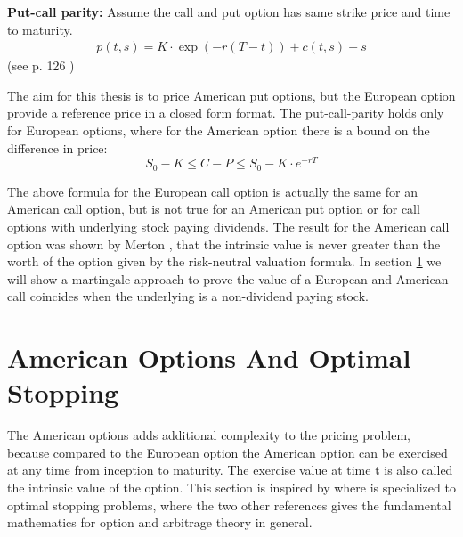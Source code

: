 \theoremstyle{proposition}
\begin{proposition}{}\label{put-call-parity}
\textbf{Put-call parity:} 
Assume the call and put option has same strike price and time to maturity.
\begin{align*}
p(t,s)=K\cdot \exp(-r(T-t))+c(t,s)-s
\end{align*}
(see p. 126 \parencite{finKont})
\end{proposition}

The aim for this thesis is to price American put options, but the European option provide a reference price in a closed form format. The put-call-parity holds only for European options, where for the American option there is a bound on the difference in price:
$$S_0 - K \leq C-P \leq S_0 - K \cdot e^{-rT}$$

The above formula for the European call option is actually the same for an American call option, but is not true for an American put option or for call options with underlying stock paying dividends. The result for the American call option was shown by Merton \parencite{Merton73}, that the intrinsic value is never greater than the worth of the option given by the risk-neutral valuation formula. In section \ref{AmericanOptions} we will show a martingale approach to prove the value of a European and American call coincides when the underlying is a non-dividend paying stock.


\section{American Options And Optimal Stopping}\label{AmericanOptions}
The American options adds additional complexity to the pricing problem, because compared to the European option the American option can be exercised at any time from inception to maturity. The exercise value at time t is also called the intrinsic value of the option. This section is inspired by \parencite{finKont, Shiryaev06,Elliott99} where \parencite{Shiryaev06} is specialized to optimal stopping problems, where the two other references gives the fundamental mathematics for option and arbitrage theory in general.\\

